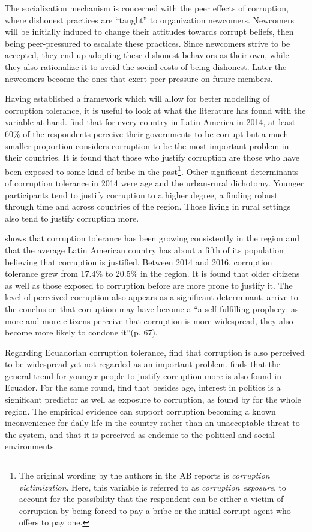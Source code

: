 \documentclass[12pt,a4]{article}\usepackage[]{graphicx}\usepackage[]{xcolor}
\begin{document}
The socialization mechanism is concerned with the peer effects of corruption, where dishonest practices are \enquote{taught} to organization newcomers. Newcomers will be initially induced to change their attitudes towards corrupt beliefs, then being peer-pressured to escalate these practices. Since newcomers strive to be accepted, they end up adopting these dishonest behaviors as their own, while they also rationalize it to avoid the social costs of being dishonest. Later the newcomers become the ones that exert peer pressure on future members.

Having established a framework which will allow for better modelling of corruption tolerance, it is useful to look at what the literature has found with the variable at hand. \textcite{Singer.2016} find that for every country in Latin America in 2014, at least 60\% of the respondents perceive their governments to be corrupt but a much smaller proportion considers corruption to be the most important problem in their countries. It is found that those who justify corruption are those who have been exposed to some kind of bribe in the past\footnote{The original wording by the authors in the AB reports is \textit{corruption victimization}. Here, this variable is referred to as \textit{corruption exposure}, to account for the possibility that the respondent can be either a victim of corruption by being forced to pay a bribe or the initial corrupt agent who offers to pay one.}. Other significant determinants of corruption tolerance in 2014 were age and the urban-rural dichotomy. Younger participants tend to justify corruption to a higher degree, a finding robust through time and across countries of the region. Those living in rural settings also tend to justify corruption more.

\textcite{Lupu.2017} shows that corruption tolerance has been growing consistently in the region and that the average Latin American country has about a fifth of its population believing that corruption is justified. Between 2014 and 2016, corruption tolerance grew from 17.4\% to 20.5\% in the region. It is found that older citizens as well as those exposed to corruption before are more prone to justify it. The level of perceived corruption also appears as a significant determinant. \textcite{Lupu.2017} arrive to the conclusion that corruption may have become a \enquote{a self-fulfilling prophecy: as more and more citizens perceive that corruption is more widespread, they also become more likely to condone it}(p. 67). 

Regarding Ecuadorian corruption tolerance, \textcite{Moscoso.2018} find that corruption is also perceived to be widespread yet not regarded as an important problem. \textcite{Montalvo.2019} finds that the general trend for younger people to justify corruption more is also found in Ecuador. For the same round, \textcite{Moscoso.2020} find that besides age, interest in politics is a significant predictor as well as exposure to corruption, as found by \textcite{Lupu.2017} for the whole region. The empirical evidence can support corruption becoming a known inconvenience for daily life in the country rather than an unacceptable threat to the system, and that it is perceived as endemic to the political and social environments. 
\end{document}
